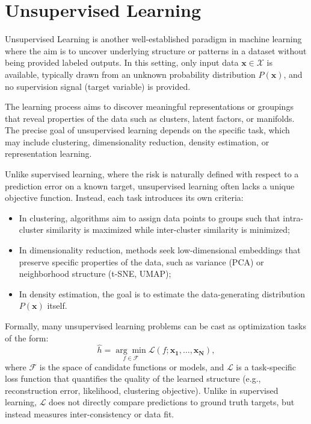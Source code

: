 \section{Unsupervised Learning}\label{sec:unsupervised_learning}
Unsupervised Learning is another well-established paradigm in machine learning
where the aim is to uncover underlying structure or patterns in a dataset
without being provided labeled outputs. In this setting, only input data
$\mathbf{x} \in \mathcal{X}$ is available, typically drawn from an unknown
probability distribution $P(\mathbf{x})$, and no supervision signal (target
variable) is provided.

The learning process aims to discover meaningful representations or groupings
that reveal properties of the data such as clusters, latent factors, or
manifolds. The precise goal of unsupervised learning depends on the specific
task, which may include clustering, dimensionality reduction, density
estimation, or representation learning.

Unlike supervised learning, where the risk is naturally defined with respect to
a prediction error on a known target, unsupervised learning often lacks a
unique objective function. Instead, each task introduces its own criteria:
\begin{itemize}
    \item In clustering, algorithms aim to assign data points to groups such that
          intra-cluster similarity is maximized while inter-cluster similarity is
          minimized;
    \item In dimensionality reduction, methods seek low-dimensional embeddings that
          preserve specific properties of the data, such as variance (PCA) or
          neighborhood structure (t-SNE, UMAP);
    \item In density estimation, the goal is to estimate the data-generating distribution
          $P(\mathbf{x})$ itself.
\end{itemize}
Formally, many unsupervised learning problems can be cast as optimization tasks of the form:
\begin{equation}
    \hat{h} = \underset{f \in \mathcal{F}}{\arg\min} \mathcal{L}(f; \mathbf{x_1,\ldots,x_N}),
\end{equation}
where $\mathcal{F}$ is the space of candidate functions or models, and
$\mathcal{L}$ is a task-specific loss function that quantifies the quality of
the learned structure (e.g., reconstruction error, likelihood, clustering
objective). Unlike in supervised learning, $\mathcal{L}$ does not directly
compare predictions to ground truth targets, but instead measures
inter-consistency or data fit.

